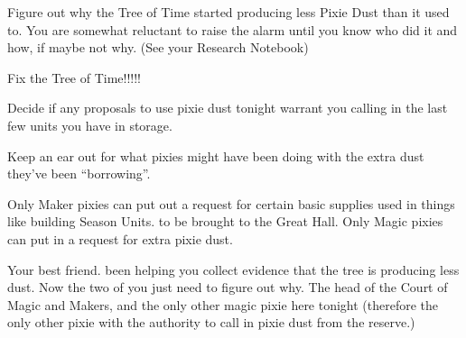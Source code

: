 \documentclass[char]{PP}
\begin{document}
\begin{itemz}
		\item Figure out why the Tree of Time started producing less Pixie Dust than it used to. You are somewhat reluctant to raise the alarm until you know who did it and how, if maybe not why. (See your Research Notebook)
	\item Fix the Tree of Time!!!!!
	\item Decide if any proposals to use pixie dust tonight warrant you calling in the last few units you have in storage.
	\item Keep an ear out for what pixies might have been doing with the extra dust they’ve been “borrowing”.
\end{itemz}

\begin{itemz}[Notes]
	\item Only Maker pixies can put out a request for certain basic supplies used in things like building Season Units. to be brought to the Great Hall. Only Magic pixies can put in a request for extra pixie dust.
\end{itemz}

\begin{contacts}
	\contact{\cSHelp{}} Your best friend. \cSHelp{\They} \cSHelp{\have} been helping you collect evidence that the tree is producing less dust. Now the two of you just need to figure out why.
	\contact{\cMHead{}} The head of the Court of Magic and Makers, and the only other magic pixie here tonight (therefore the only other pixie with the authority to call in pixie dust from the reserve.)
\end{contacts}
\end{document}
